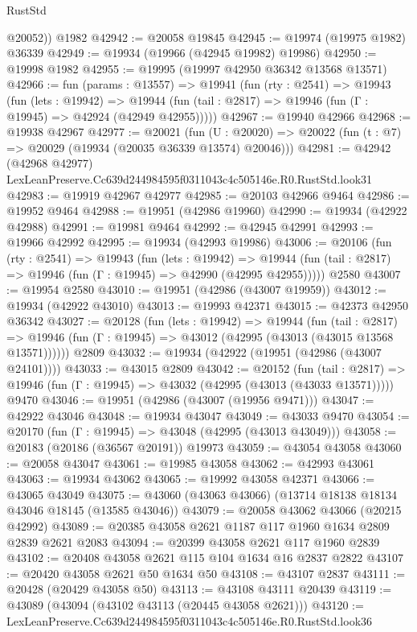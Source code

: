 \begin{lexlean}{RustStd}
\begin{coremodule}
        @20052))
    @1982
@42942 := @20058 @19845
@42945 := @19974 (@19975 @1982) @36339
@42949 := @19934 (@19966 (@42945 @19982) @19986)
@42950 := @19998 @1982
@42955 := @19995 (@19997 @42950 @36342 @13568 @13571)
@42966 := fun (params : @13557) =>
  @19941
    (fun (rty : @2541) =>
    @19943
      (fun (lets : @19942) =>
      @19944 (fun (tail : @2817) => @19946 (fun (Γ : @19945) => @42924 (@42949 @42955)))))
@42967 := @19940 @42966
@42968 := @19938 @42967
@42977 := @20021
    (fun (U : @20020) => @20022 (fun (t : @7) => @20029 (@19934 (@20035 @36339 @13574) @20046)))
@42981 := @42942 (@42968 @42977) LexLeanPreserve.Cc639d244984595f0311043c4c505146e.R0.RustStd.look31
@42983 := @19919 @42967 @42977
@42985 := @20103 @42966 @9464
@42986 := @19952 @9464
@42988 := @19951 (@42986 @19960)
@42990 := @19934 (@42922 @42988)
@42991 := @19981 @9464
@42992 := @42945 @42991
@42993 := @19966 @42992
@42995 := @19934 (@42993 @19986)
@43006 := @20106
    (fun (rty : @2541) =>
    @19943
      (fun (lets : @19942) =>
      @19944 (fun (tail : @2817) => @19946 (fun (Γ : @19945) => @42990 (@42995 @42955)))))
    @2580
@43007 := @19954 @2580
@43010 := @19951 (@42986 (@43007 @19959))
@43012 := @19934 (@42922 @43010)
@43013 := @19993 @42371
@43015 := @42373 @42950 @36342
@43027 := @20128
    (fun (lets : @19942) =>
    @19944
      (fun (tail : @2817) =>
      @19946 (fun (Γ : @19945) => @43012 (@42995 (@43013 (@43015 @13568 @13571))))))
    @2809
@43032 := @19934 (@42922 (@19951 (@42986 (@43007 @24101))))
@43033 := @43015 @2809
@43042 := @20152
    (fun (tail : @2817) => @19946 (fun (Γ : @19945) => @43032 (@42995 (@43013 (@43033 @13571)))))
    @9470
@43046 := @19951 (@42986 (@43007 (@19956 @9471)))
@43047 := @42922 @43046
@43048 := @19934 @43047
@43049 := @43033 @9470
@43054 := @20170 (fun (Γ : @19945) => @43048 (@42995 (@43013 @43049)))
@43058 := @20183 (@20186 (@36567 @20191)) @19973
@43059 := @43054 @43058
@43060 := @20058 @43047
@43061 := @19985 @43058
@43062 := @42993 @43061
@43063 := @19934 @43062
@43065 := @19992 @43058 @42371
@43066 := @43065 @43049
@43075 := @43060 (@43063 @43066) (@13714 @18138 @18134 @43046 @18145 (@13585 @43046))
@43079 := @20058 @43062 @43066 (@20215 @42992)
@43089 := @20385 @43058 @2621 @1187 @117 @1960 @1634 @2809 @2839 @2621 @2083
@43094 := @20399 @43058 @2621 @117 @1960 @2839
@43102 := @20408 @43058 @2621 @115 @104 @1634 @16 @2837 @2822
@43107 := @20420 @43058 @2621 @50 @1634 @50
@43108 := @43107 @2837
@43111 := @20428 (@20429 @43058 @50)
@43113 := @43108 @43111 @20439
@43119 := @43089 (@43094 (@43102 @43113 (@20445 @43058 @2621)))
@43120 := LexLeanPreserve.Cc639d244984595f0311043c4c505146e.R0.RustStd.look36

\end{coremodule}
\end{lexlean}
